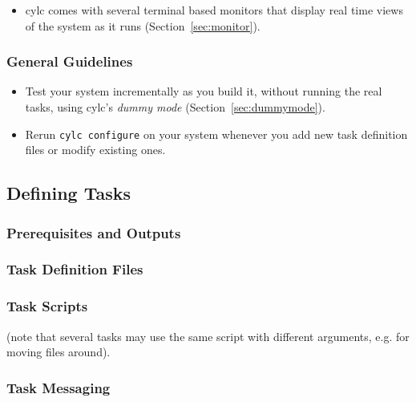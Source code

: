 \documentclass[11pt,a4paper]{article}
\begin{document}
\begin{itemize}
    \item cylc comes with several terminal based monitors that display
        real time views of the system as it runs (Section~\ref{sec:monitor}).
\end{itemize}


\subsubsection{General Guidelines}

\begin{itemize}

    \item Test your system incrementally as you build it, without
        running the real tasks, using cylc's {\em dummy mode}
        (Section~\ref{sec:dummymode}).

    \item Rerun \verb=cylc configure= on your system whenever you add
        new task definition files or modify existing ones.
\end{itemize}

\pagebreak
\label{sec:tasktype}
\subsection{Defining Tasks}

\label{sec:requisites}
\subsubsection{Prerequisites and Outputs}

\label{sec:taskdef}
\subsubsection{Task Definition Files}

\lstset{language=, numbers=left}

{
\color{Magenta}

}

\subsubsection{Task Scripts}

(note that several tasks may use the same script with different
arguments, e.g. for moving files around).

\subsubsection{Task Messaging}
\end{document}
